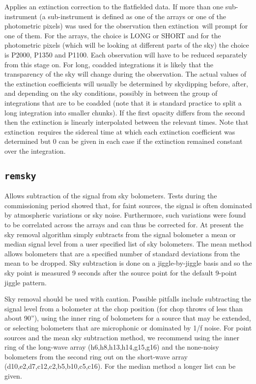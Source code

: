 \documentclass[twoside,11pt,fleqn]{article}
\newcommand{\task}[1]{{\sf #1}}
\newcommand{\ext}{\xref{\task{extinction}}{sun216}{EXTINCTION}}
\newcommand{\xref}[3]{#1}
\begin{document}
Applies an extinction correction to the flatfielded data. If more than
one sub-instrument (a sub-instrument is defined as one of the arrays
or one of the photometric pixels) was used for the observation then
\ext\ will prompt for one of them. For the arrays, the
choice is LONG or SHORT and for the photometric pixels (which will be
looking at different parts of the sky) the choice is P2000, P1350 and
P1100.  Each observation will have to be reduced separately from this
stage on. For long, coadded integrations it is likely that the
transparency of the sky will change during the observation. The actual
values of the extinction coefficients will usually be determined by
skydipping before, after, and depending on the sky conditions,
possibly in between the group of integrations that are to be coadded
(note that it is standard practice to split a long integration into
smaller chunks). If the first opacity differs from the second then the
extinction is linearly interpolated between the relevant times. Note
that \ext\ requires the sidereal time at which each
extinction coefficient was determined but 0 can be given in each case
if the extinction remained constant over the integration.

\subsection{{\tt remsky}}

Allows subtraction of the signal from sky bolometers. Tests during the
commissioning period showed that, for faint sources, the signal is
often dominated by atmospheric variations or sky noise. Furthermore,
such variations were found to be correlated across the arrays and can
thus be corrected for. At present the sky removal algorithm simply
subtracts from the signal bolometer a mean or median signal level from
a user specified list of sky bolometers. The mean method allows
bolometers that are a specified number of standard deviations from the
mean to be dropped.  Sky subtraction is done on a jiggle-by-jiggle
basis and so the sky point is measured 9 seconds after the source
point for the default 9-point jiggle pattern.

Sky removal should be used with caution. Possible pitfalls include
subtracting the signal level from a bolometer at the chop position
(for chop throws of less than about 90''), using the inner ring of
bolometers for a source that may be extended, or selecting bolometers
that are microphonic or dominated by 1/f noise. For point sources and
the mean sky subtraction method, we recommend using the inner ring of
the long-wave array (h6,h8,h13,h14,g15,g16) and the none-noisy
bolometers from the second ring out on the short-wave array
(d10,e2,d7,c12,c2,b5,b10,c5,c16). For the median method a longer list
can be given.
\end{document}
